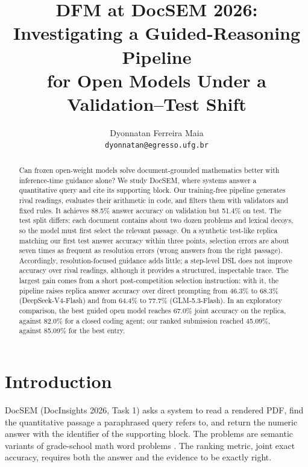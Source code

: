 \documentclass[11pt]{article}%
\title{DFM at DocSEM 2026: Investigating a Guided-Reasoning Pipeline\\
for Open Models Under a Validation--Test Shift}
\author{%
  Dyonnatan Ferreira Maia \\
  \texttt{dyonnatan@egresso.ufg.br}
}
\date{}
\begin{document}
\maketitle

\begin{abstract}
Can frozen open-weight models solve document-grounded mathematics better
with inference-time guidance alone? We study DocSEM, where systems answer a
quantitative query and cite its supporting block. Our training-free pipeline
generates rival readings, evaluates their arithmetic in code, and filters them
with validators and fixed rules. It achieves 88.5\% answer accuracy on
validation but 51.4\% on test. The test split differs: each document contains
about two dozen problems and lexical decoys, so the model must first select the
relevant passage. On a synthetic test-like replica matching our first test
answer accuracy within three points, selection errors are about seven times as
frequent as resolution errors (wrong answers from the right passage).
Accordingly, resolution-focused guidance adds little; a step-level DSL does not
improve accuracy over rival readings, although it provides a structured,
inspectable trace. The largest gain comes from a short post-competition
selection instruction: with it, the pipeline raises replica answer accuracy
over direct prompting from 46.3\% to 68.3\% (DeepSeek-V4-Flash) and from
64.4\% to 77.7\% (GLM-5.3-Flash). In an exploratory comparison, the best guided
open model reaches 67.0\% joint accuracy on the replica, against 82.0\% for a
closed coding agent; our ranked submission reached 45.09\%, against 85.09\% for
the best entry.
\end{abstract}

\section{Introduction}
\label{sec:intro}

DocSEM (DocInsights 2026, Task 1) asks a system to read a rendered PDF, find
the quantitative passage a paraphrased query refers to, and return the numeric
answer with the identifier of the supporting block. The problems are semantic variants \citep{singh2026gsmsem} of grade-school math word problems \citep{cobbe2021gsm8k}. The ranking metric, joint
exact accuracy, requires both the answer and the evidence to be exactly right.
\end{document}
